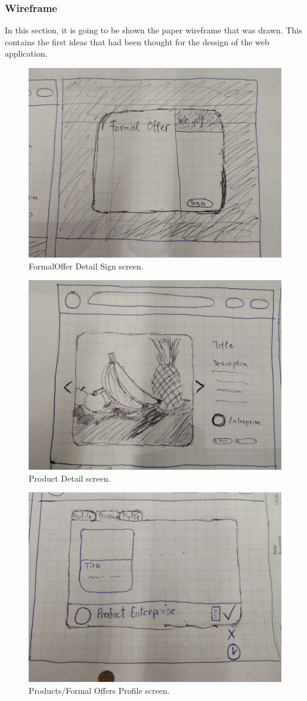 \documentclass[./main.tex]{subfiles}
\begin{document}
\subsubsection{Wireframe}
In this section, it is going to be shown the paper wireframe that was drawn. This contains the first ideas that had been thought for the dessign of the web application.
\begin{figure}[H]
  \centering
  \includegraphics[width=0.5\linewidth]{img/webwire_1.jpeg}
  \caption{FormalOffer Detail Sign screen.}
  \label{fig:webwire-screen-1}
\end{figure}
\begin{figure}[H]
  \centering
  \includegraphics[width=0.5\linewidth]{img/webwire_2.jpeg}
  \caption{Product Detail screen.}
  \label{fig:webwire-screen-1}
\end{figure}
\begin{figure}[H]
  \centering
  \includegraphics[width=0.5\linewidth]{img/webwire_3.jpeg}
  \caption{Products/Formal Offers Profile screen.}
  \label{fig:webwire-screen-1}
\end{figure}
\end{document}
